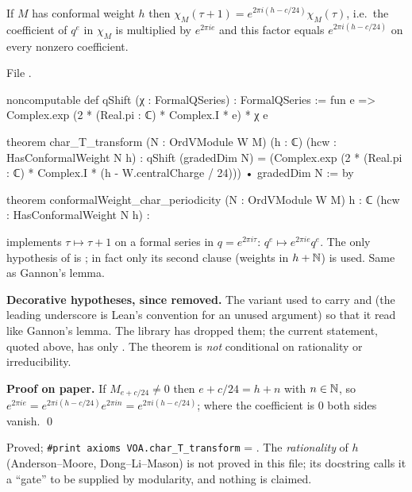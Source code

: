 \begin{theorem}\label{l12:thm:Tperiod}
If $M$ has conformal weight $h$ then $\chi_M(\tau+1) = e^{2\pi i(h-c/24)}\chi_M(\tau)$, i.e.\ the coefficient
of $q^e$ in $\chi_M$ is multiplied by $e^{2\pi ie}$ and this factor equals $e^{2\pi i(h-c/24)}$ on every
nonzero coefficient.
\end{theorem}
\noindent File .
\begin{leancode}
noncomputable def qShift (χ : FormalQSeries) : FormalQSeries :=
  fun e => Complex.exp (2 * (Real.pi : ℂ) * Complex.I * e) * χ e

theorem char_T_transform (N : OrdVModule W M) (h : ℂ) (hcw : HasConformalWeight N h) :
    qShift (gradedDim N)
      = (Complex.exp (2 * (Real.pi : ℂ) * Complex.I * (h - W.centralCharge / 24)))
          • gradedDim N := by

theorem conformalWeight_char_periodicity (N : OrdVModule W M)
    {h : ℂ} (hcw : HasConformalWeight N h) :
\end{leancode}

\begin{dictionary}
 implements $\tau\mapsto\tau+1$ on a formal series in $q = e^{2\pi i\tau}$: $q^e\mapsto e^{2\pi ie}q^e$.
The only hypothesis of  is ; in fact only its second clause
(weights in $h+{\mathbb{N}}$) is used. Same as Gannon's lemma.

\textbf{Decorative hypotheses, since removed.} The variant
\allowbreak{}\allowbreak{} used to carry  and
 (the leading underscore is Lean's convention for an unused argument) so
that it read like Gannon's lemma. The library has dropped them; the current statement, quoted above, has only
. The theorem is \emph{not} conditional on rationality or irreducibility.
\end{dictionary}

\textbf{Proof on paper.} If $M_{e+c/24}\neq0$ then $e+c/24 = h+n$ with $n\in{\mathbb{N}}$, so
$e^{2\pi ie} = e^{2\pi i(h-c/24)}e^{2\pi in} = e^{2\pi i(h-c/24)}$; where the coefficient is $0$ both sides vanish.
\qed

\begin{status}
Proved; \texttt{\#print axioms VOA.char\_T\_transform} = .
The \emph{rationality} of $h$ (Anderson--Moore, Dong--Li--Mason) is not proved in this file; its docstring calls
it a ``gate'' to be supplied by modularity, and nothing is claimed.
\end{status}


